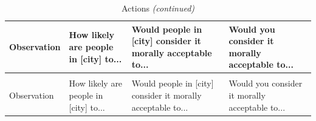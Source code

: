 \documentclass[
]{article}
\begin{document}
\begin{longtable}[t]{>{\raggedright\arraybackslash}p{6.5cm}>{\raggedright\arraybackslash}p{2.5cm}>{\raggedright\arraybackslash}p{2.5cm}>{\raggedright\arraybackslash}p{2.5cm}}
\caption{\label{tab:print-scenarios}Actions}\\
\toprule
Observation & How likely are people in [city] to... & Would people in [city] consider it morally acceptable to... & Would you consider it morally acceptable to...\\
\midrule
\endfirsthead
\caption[]{Actions \textit{(continued)}}\\
\toprule
Observation & How likely are people in [city] to... & Would people in [city] consider it morally acceptable to... & Would you consider it morally acceptable to...\\
\midrule
\endhead


\end{longtable}
\end{document}
